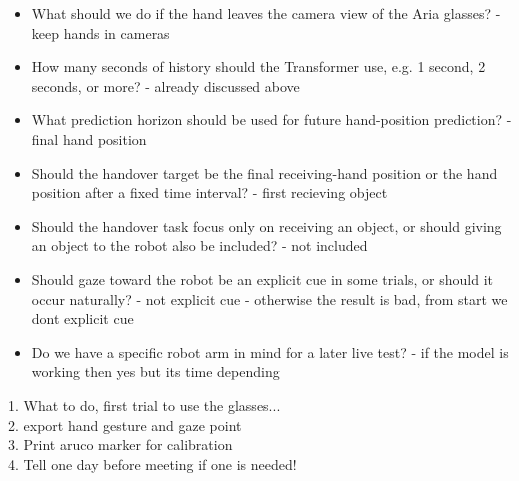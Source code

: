 \documentclass[11pt,a4paper]{article}
\begin{document}
\begin{itemize}
    \item What should we do if the hand leaves the camera view of the Aria glasses?
    - keep hands in cameras 
    
    \item How many seconds of history should the Transformer use, e.g. 1 second, 2 seconds, or more?
    - already discussed above
    
    \item What prediction horizon should be used for future hand-position prediction?
    - final hand position
    
    \item Should the handover target be the final receiving-hand position or the hand position after a fixed time interval?
    - first recieving object
    
    \item Should the handover task focus only on receiving an object, or should giving an object to the robot also be included?
    - not included
    
    \item Should gaze toward the robot be an explicit cue in some trials, or should it occur naturally?
    - not explicit cue - otherwise the result is bad, from start we dont explicit cue 
     
    \item Do we have a specific robot arm in mind for a later live test?
    - if the model is working then yes but its time depending

\end{itemize}


1. What to do, first trial to use the glasses...\\
2. export hand gesture and gaze point\\
3. Print aruco marker for calibration\\
4. Tell one day before meeting if one is needed!\\
\end{document}
